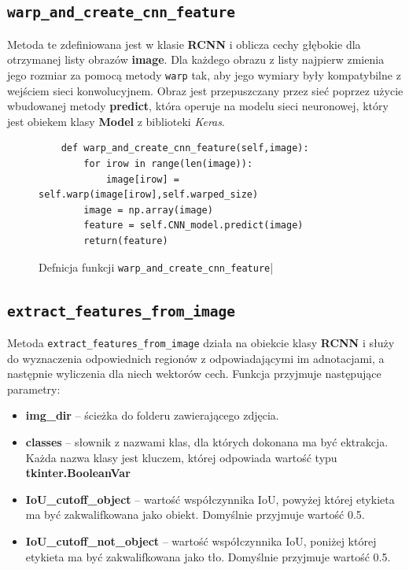 \documentclass[a4paper,twoside,12pt]{book}
\begin{document}
\subsection{\lstinline|warp_and_create_cnn_feature|}
{Metoda te zdefiniowana jest w klasie \textbf{RCNN} i oblicza cechy głębokie dla otrzymanej listy obrazów \textbf{image}. Dla każdego obrazu z listy najpierw zmienia jego rozmiar za pomocą metody \lstinline|warp| tak, aby jego wymiary były kompatybilne z wejściem sieci konwolucyjnem. Obraz jest przepuszczany przez sieć poprzez użycie wbudowanej metody \textbf{predict}, która operuje na modelu sieci neuronowej, który jest obiekem klasy \textbf{Model} z biblioteki \emph{Keras}. }
\begin{figure}[h!]
\centering
\begin{lstlisting}
    def warp_and_create_cnn_feature(self,image):
        for irow in range(len(image)):
            image[irow] = self.warp(image[irow],self.warped_size)
        image = np.array(image)
        feature = self.CNN_model.predict(image)
        return(feature)
\end{lstlisting}
\caption{Defnicja funkcji \lstinline|warp_and_create_cnn_feature||}
\label{warp}
\end{figure}
\subsection{\lstinline|extract_features_from_image|}
{Metoda \lstinline|extract_features_from_image| działa na obiekcie klasy \textbf{RCNN} i służy do wyznaczenia odpowiednich regionów z odpowiadającymi im adnotacjami, a następnie wyliczenia dla niech wektorów cech. Funkcja przyjmuje  następujące parametry:}
\begin{itemize}
\item {\textbf{img\_dir} – ścieżka do folderu zawierającego zdjęcia.}
\item {\textbf{classes} – słownik z nazwami klas, dla których dokonana ma być ektrakcja. Każda nazwa klasy jest kluczem, której odpowiada wartość typu \textbf{tkinter.BooleanVar}}
\item {\textbf{IoU\_cutoff\_object} – wartość współczynnika IoU, powyżej której etykieta ma być zakwalifkowana jako obiekt. Domyślnie przyjmuje wartość 0.5.}
\item {\textbf{IoU\_cutoff\_not\_object} – wartość współczynnika IoU, poniżej której etykieta ma być zakwalifkowana jako tło. Domyślnie przyjmuje wartość 0.5.}
\end{itemize}
\end{document}
